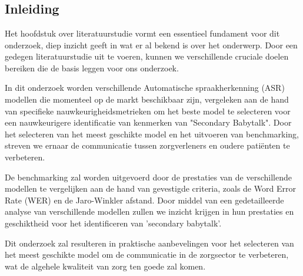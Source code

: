 \chapter{}%
\label{ch:stand-van-zaken}


\section{Inleiding}


Het hoofdstuk over literatuurstudie vormt een essentieel fundament voor dit onderzoek, diep inzicht ge­eft in wat er al beke­nd is over het onderwe­rp. Door een gedegen literatuurstudie uit te voeren, kunnen we verschillende cruciale doelen bereiken die de basis leggen voor ons onderzoek.

In dit onderzoek worden verschillende Automatische spraakherkenning (ASR)  modellen die momenteel op de markt beschikbaar zijn, vergeleken aan de hand van specifieke nauwkeurigheidsmetrieken om het beste model te selecteren voor een nauwkeurigere identificatie van kenmerken van "Secondary Babytalk". Door het selecteren van het meest geschikte model en het uitvoeren van benchmarking, streven we ernaar de communicatie tussen zorgverleners en oudere patiënten te verbeteren. 


De benchmarking zal worden uitgevoerd door de prestaties van de verschillende modellen te vergelijken aan de hand van gevestigde criteria, zoals de Word Error Rate (WER) en de Jaro-Winkler afstand. 
Door middel van een gedetailleerde analyse van verschillende modellen zullen we inzicht krijgen in hun prestaties en geschiktheid voor het identificeren van 'secondary babytalk'. 


Dit onderzoek zal resulteren in praktische aanbevelingen voor het selecteren van het meest geschikte model om de communicatie in de zorgsector te verbeteren, wat de algehele kwaliteit van zorg ten goede zal komen.



